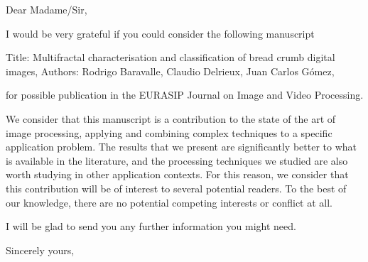 \documentclass{letter}
\begin{document}
 
\begin{letter}{}
\opening{Dear Madame/Sir,}

I would be very grateful if you could consider the following manuscript

Title: Multifractal characterisation and classification of bread crumb digital images,
Authors: Rodrigo Baravalle, Claudio Delrieux, Juan Carlos G\'omez,

for possible publication in the EURASIP Journal on Image and Video Processing.

We consider that this manuscript is a contribution to the state of the art of image processing, applying and combining complex techniques to a specific application problem. The results that we present are significantly better to what is available in the literature, and the processing techniques we studied are also worth studying in other application contexts. For this reason, we consider that this contribution will be of interest to several potential readers. To the best of our knowledge, there are no potential competing interests or conflict at all.

I will be glad to send you any further information you might need.

\closing{Sincerely yours,}

 
\end{letter}
 
\end{document}
